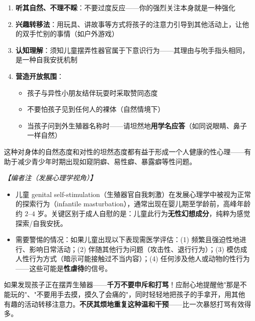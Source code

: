 \documentclass[12pt,a4paper,twoside]{ctexbook}
\begin{document}
\begin{enumerate}
	\item \textbf{听其自然、不理不睬}：不要过度反应——你的强烈关注本身就是一种强化

	\vspace{0.3em}
	\item \textbf{兴趣转移法}：用玩具、讲故事等方式将孩子的注意力引导到其他活动上，让他的双手忙别的事情（如户外游戏）

	\vspace{0.3em}
	\item \textbf{认知理解}：须知儿童摆弄性器官属于下意识行为——其理由与吮手指头相同，是一种自我安抚机制

	\vspace{0.3em}
	\item \textbf{营造开放氛围}：
	\begin{itemize}
		\item 孩子与异性小朋友结伴玩耍时采取赞同态度
		\item 不要怕孩子见到任何人的裸体（自然情境下）
		\item 当孩子问到外生殖器名称时——请坦然地\textbf{用学名应答}（如同说眼睛、鼻子一样自然）
	\end{itemize}
\end{enumerate}

这种对身体的自然态度和对性的坦然态度都有益于形成一个人健康的性心理——有助于减少青少年时期出现如窥阴癖、易性癖、暴露癖等性问题。

\vspace{0.3em}
\noindent\textit{【编者注（发展心理学视角）】}
\begin{itemize}
	\item 儿童 genital self-stimulation（生殖器官自我刺激）在发展心理学中被视为正常的探索行为（infantile masturbation），通常出现在婴儿期至学龄前，高峰年龄约 $2$--$4$ 岁。关键区别于成人自慰的是：儿童此行为\textbf{无性幻想成分}，纯粹为感觉探索/自我安抚。
	\item 需要警惕的情况：如果儿童出现以下表现需医学评估：(1) 频繁且强迫性地进行、影响日常活动；(2) 伴随其他行为问题（攻击性、退行行为）；(3) 模仿成人性行为方式（暗示可能接触过不当内容）；(4) 任何涉及他人或动物的性行为——这些可能是\textbf{性虐待}的信号。
\end{itemize}

\begin{tcolorbox}[colback=pink!5!white,colframe=red!50!black,title=贴心小叮咛]
如果发现孩子正在摆弄生殖器——\textbf{千万不要申斥和打骂}！应耐心地提醒他"那是不能玩的"、"不要用手去摸，摸久了会痛的"，同时轻轻地把孩子的手拿开，用其他有趣的活动转移注意力。\textbf{不厌其烦地重复这种温和干预}——比一次暴怒打骂有效得多。
\end{tcolorbox}
\end{document}
